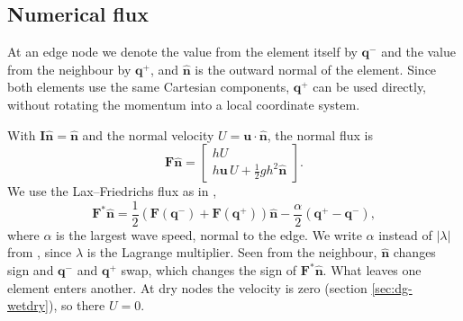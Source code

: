 \subsection{Numerical flux}\label{sec:dg-flux}
At an edge node we denote the value from the element itself by $\mathbf{q}^-$ and the value from the neighbour by $\mathbf{q}^+$, and $\hat{\mathbf{n}}$ is the outward normal of the element. Since both elements use the same Cartesian components, $\mathbf{q}^+$ can be used directly, without rotating the momentum into a local coordinate system.

With $\mathbf{I}\hat{\mathbf{n}} = \hat{\mathbf{n}}$ and the normal velocity $U = \mathbf{u}\cdot\hat{\mathbf{n}}$, the normal flux is
\begin{equation}\label{eq:dg-normalflux}
    \mathbf{F}\hat{\mathbf{n}} =
    \begin{bmatrix}
    hU\\
    h\mathbf{u}\,U + \frac12gh^2\hat{\mathbf{n}}
    \end{bmatrix}.
\end{equation}
We use the Lax--Friedrichs flux as in \cite{GIRALDO2002499,bonev2018discontinuous},
\begin{equation}\label{eq:dg-lf}
    \mathbf{F}^*\hat{\mathbf{n}} = \frac12\left(\mathbf{F}(\mathbf{q}^-) + \mathbf{F}(\mathbf{q}^+)\right)\hat{\mathbf{n}} - \frac{\alpha}{2}\left(\mathbf{q}^+ - \mathbf{q}^-\right),
\end{equation}
where $\alpha$ is the largest wave speed, normal to the edge. We write $\alpha$ instead of $|\lambda|$ from \cite{GIRALDO2002499}, since $\lambda$ is the Lagrange multiplier. Seen from the neighbour, $\hat{\mathbf{n}}$ changes sign and $\mathbf{q}^-$ and $\mathbf{q}^+$ swap, which changes the sign of $\mathbf{F}^*\hat{\mathbf{n}}$. What leaves one element enters another. At dry nodes the velocity is zero (section \ref{sec:dg-wetdry}), so there $U = 0$.

